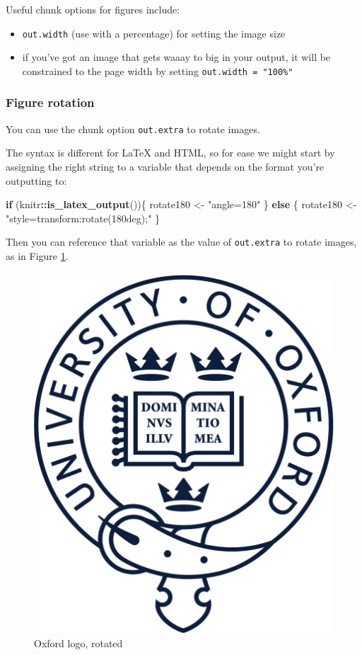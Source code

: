 \documentclass[a4paper, twoside]{templates/ociamthesis}
\providecommand{\tightlist}{%
  \setlength{\itemsep}{0pt}\setlength{\parskip}{0pt}}
\newenvironment{Shaded}{\begin{snugshade}}{\end{snugshade}}
\newcommand{\ControlFlowTok}[1]{\textcolor[rgb]{0.13,0.29,0.53}{\textbf{#1}}}
\newcommand{\KeywordTok}[1]{\textcolor[rgb]{0.13,0.29,0.53}{\textbf{#1}}}
\newcommand{\NormalTok}[1]{#1}
\newcommand{\OperatorTok}[1]{\textcolor[rgb]{0.81,0.36,0.00}{\textbf{#1}}}
\newcommand{\StringTok}[1]{\textcolor[rgb]{0.31,0.60,0.02}{#1}}
\renewenvironment{Shaded}
{
  \vspace{10pt}%
  \begin{snugshade}%
}{%
  \end{snugshade}%
  \vspace{8pt}%
}
\theoremstyle{definition}
\theoremstyle{definition}
\theoremstyle{definition}
\theoremstyle{definition}
\theoremstyle{remark}
\begin{document}
Useful chunk options for figures include:

\begin{itemize}
\tightlist
\item
  \texttt{out.width} (use with a percentage) for setting the image size
\item
  if you've got an image that gets waaay to big in your output, it will be constrained to the page width by setting \texttt{out.width\ =\ "100\%"}
\end{itemize}

\hypertarget{figure-rotation}{%
\subsubsection*{Figure rotation}\label{figure-rotation}}

You can use the chunk option \texttt{out.extra} to rotate images.

The syntax is different for LaTeX and HTML, so for ease we might start by assigning the right string to a variable that depends on the format you're outputting to:

\begin{Shaded}
\begin{Highlighting}[]
\ControlFlowTok{if}\NormalTok{ (knitr}\OperatorTok{::}\KeywordTok{is\_latex\_output}\NormalTok{())\{}
\NormalTok{  rotate180 \textless{}{-}}\StringTok{ "angle=180"}
\NormalTok{\} }\ControlFlowTok{else}\NormalTok{ \{}
\NormalTok{  rotate180 \textless{}{-}}\StringTok{ "style=\textquotesingle{}transform:rotate(180deg);\textquotesingle{}"}
\NormalTok{\}}
\end{Highlighting}
\end{Shaded}

Then you can reference that variable as the value of \texttt{out.extra} to rotate images, as in Figure \ref{fig:oxford-logo-rotated}.

\begin{figure}

{\centering \includegraphics[width=0.5\linewidth,angle=180]{figures/sample-content/beltcrest} 

}

\caption{Oxford logo, rotated}\label{fig:oxford-logo-rotated}
\end{figure}
\end{document}
